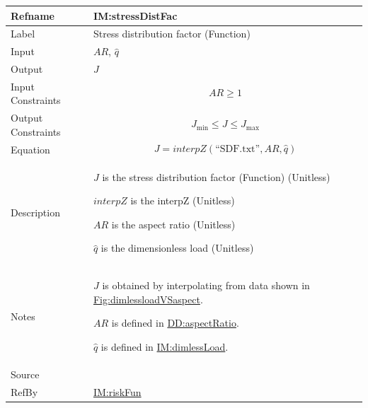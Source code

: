 \documentclass[12pt]{article}
\begin{document}
\medskip
\noindent
\begin{minipage}{\textwidth}
\begin{tabular}{>{\raggedright}p{}>{\raggedright\arraybackslash}p{}}
\toprule \textbf{Refname} & \textbf{IM:stressDistFac}
\label{IM:stressDistFac}
\\ \midrule
Label & Stress distribution factor (Function)
        
\\ \midrule
Input & $\mathit{AR}$, $\hat{q}$
        
\\ \midrule
Output & $J$
         
\\ \midrule
Input Constraints & \begin{displaymath}
                    \mathit{AR}\geq{}1
                    \end{displaymath}
\\ \midrule
Output Constraints & \begin{displaymath}
                     {J_{\text{min}}}\leq{}J\leq{}{J_{\text{max}}}
                     \end{displaymath}
\\ \midrule
Equation & \begin{displaymath}
           J=\mathit{interpZ}\left(\text{``SDF.txt''},\mathit{AR},\hat{q}\right)
           \end{displaymath}
\\ \midrule
Description & \begin{symbDescription}
              \item{$J$ is the stress distribution factor (Function) (Unitless)}
              \item{$\mathit{interpZ}$ is the interpZ (Unitless)}
              \item{$\mathit{AR}$ is the aspect ratio (Unitless)}
              \item{$\hat{q}$ is the dimensionless load (Unitless)}
              \end{symbDescription}
\\ \midrule
Notes & $J$ is obtained by interpolating from data shown in \hyperref[Figure:dimlessloadVSaspect]{Fig:dimlessloadVSaspect}.
        
        $\mathit{AR}$ is defined in \hyperref[DD:aspectRatio]{DD:aspectRatio}.
        
        $\hat{q}$ is defined in \hyperref[IM:dimlessLoad]{IM:dimlessLoad}.
        
\\ \midrule
Source & \cite{astm2009}
         
\\ \midrule
RefBy & \hyperref[IM:riskFun]{IM:riskFun}
        
\\ \bottomrule
\end{tabular}
\end{minipage}
\end{document}
